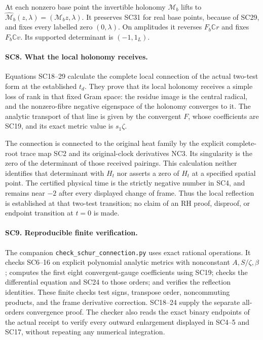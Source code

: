\documentclass[11pt,a4paper]{article}
\theoremstyle{definition}\newtheorem{definition}[theorem]{Definition}
\begin{document}
At each nonzero base point the invertible holonomy
\(\mathcal M_b\) lifts to
\(\widehat{\mathcal M}_b(z,\lambda)=(\mathcal M_bz,\lambda)\).
It preserves SC31 for real base points, because of SC29, and
fixes every labelled zero \((0,\lambda)\). On amplitudes it
reverses \(F_b\mathbb Cr\) and fixes \(F_b\mathbb Cv\).
Its supported determinant is \((-1,1_L)\).

\paragraph{SC8. What the local holonomy receives.}
Equations SC18--29 calculate the complete local connection of
the actual two-test form at the established \(t_d\).
They prove that its local holonomy receives a simple loss of
rank in that fixed Gram space: the residue image is the
central radical, and the nonzero-fibre negative eigenspace of
the holonomy converges to it. The analytic transport of that
line is given by the convergent \(F\), whose coefficients are
SC19, and its exact metric value is \(s_1\zeta\).

The connection is connected to the original heat family by the
explicit complete-root trace map SC2 and its original-clock
derivatives NC3. Its singularity is the zero of the determinant
of those received pairings. This calculation neither
identifies that determinant with \(H_t\) nor asserts a zero of
\(H_t\) at a specified spatial point. The certified physical
time is the strictly negative number in SC4, and remains near
\(-2\) after every displayed change of frame. Thus the local
reflection is established at that two-test transition; no
claim of an RH proof, disproof, or endpoint transition at
\(t=0\) is made.

\paragraph{SC9. Reproducible finite verification.}
The companion \texttt{check\_schur\_connection.py} uses exact
rational operations. It checks SC6--16 on explicit polynomial
analytic metrics with nonconstant \(A,S/\zeta,\beta\); computes
the first eight convergent-gauge coefficients using SC19;
checks the differential equation and SC24 to those orders;
and verifies the reflection identities. These finite checks
test signs, transpose order, noncommuting products, and the
frame derivative correction. SC18--24 supply the separate
all-orders convergence proof. The checker also reads the exact
binary endpoints of the actual receipt to verify every
outward enlargement displayed in SC4--5 and SC17, without
repeating any numerical integration.
\end{document}
